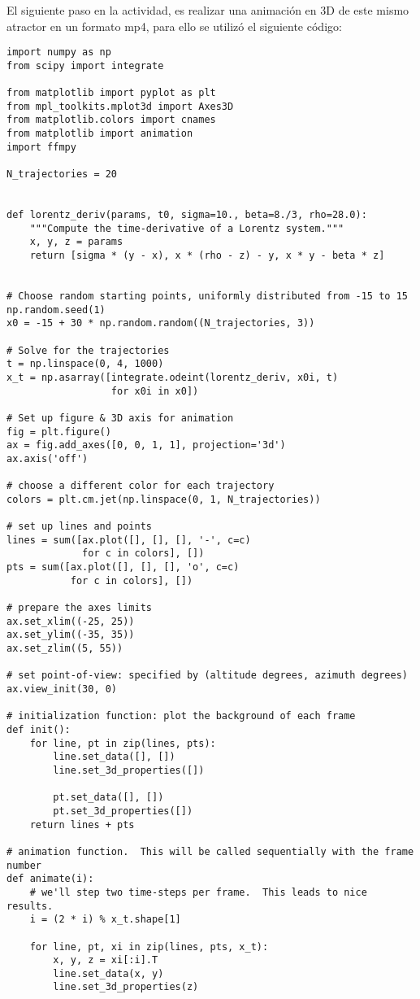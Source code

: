 \documentclass{article}
\begin{document}
El siguiente paso en la actividad, es realizar una animación en 3D de este mismo atractor en un formato mp4, para ello se utilizó el siguiente código:\\
\begin{verbatim}
import numpy as np
from scipy import integrate

from matplotlib import pyplot as plt
from mpl_toolkits.mplot3d import Axes3D
from matplotlib.colors import cnames
from matplotlib import animation
import ffmpy

N_trajectories = 20


def lorentz_deriv(params, t0, sigma=10., beta=8./3, rho=28.0):
    """Compute the time-derivative of a Lorentz system."""
    x, y, z = params
    return [sigma * (y - x), x * (rho - z) - y, x * y - beta * z]


# Choose random starting points, uniformly distributed from -15 to 15
np.random.seed(1)
x0 = -15 + 30 * np.random.random((N_trajectories, 3))

# Solve for the trajectories
t = np.linspace(0, 4, 1000)
x_t = np.asarray([integrate.odeint(lorentz_deriv, x0i, t)
                  for x0i in x0])

# Set up figure & 3D axis for animation
fig = plt.figure()
ax = fig.add_axes([0, 0, 1, 1], projection='3d')
ax.axis('off')

# choose a different color for each trajectory
colors = plt.cm.jet(np.linspace(0, 1, N_trajectories))

# set up lines and points
lines = sum([ax.plot([], [], [], '-', c=c)
             for c in colors], [])
pts = sum([ax.plot([], [], [], 'o', c=c)
           for c in colors], [])

# prepare the axes limits
ax.set_xlim((-25, 25))
ax.set_ylim((-35, 35))
ax.set_zlim((5, 55))

# set point-of-view: specified by (altitude degrees, azimuth degrees)
ax.view_init(30, 0)

# initialization function: plot the background of each frame
def init():
    for line, pt in zip(lines, pts):
        line.set_data([], [])
        line.set_3d_properties([])

        pt.set_data([], [])
        pt.set_3d_properties([])
    return lines + pts

# animation function.  This will be called sequentially with the frame number
def animate(i):
    # we'll step two time-steps per frame.  This leads to nice results.
    i = (2 * i) % x_t.shape[1]

    for line, pt, xi in zip(lines, pts, x_t):
        x, y, z = xi[:i].T
        line.set_data(x, y)
        line.set_3d_properties(z)


\end{verbatim}
\end{document}
